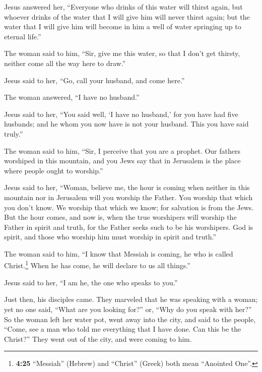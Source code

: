  Jesus answered her, ``Everyone who drinks of this water
will thirst again,  but whoever drinks of the water that
I will give him will never thirst again; but the water that I will give
him will become in him a well of water springing up to eternal life.''

 The woman said to him, ``Sir, give me this water, so
that I don't get thirsty, neither come all the way here to draw.''

 Jesus said to her, ``Go, call your husband, and come
here.''

 The woman answered, ``I have no husband.''

Jesus said to her, ``You said well, `I have no husband,' 
for you have had five husbands; and he whom you now have is not your
husband. This you have said truly.''

 The woman said to him, ``Sir, I perceive that you are a
prophet.  Our fathers worshiped in this mountain, and you
Jews say that in Jerusalem is the place where people ought to worship.''

 Jesus said to her, ``Woman, believe me, the hour is
coming when neither in this mountain nor in Jerusalem will you worship
the Father.  You worship that which you don't know. We
worship that which we know; for salvation is from the Jews.
 But the hour comes, and now is, when the true worshipers
will worship the Father in spirit and truth, for the Father seeks such
to be his worshipers.  God is spirit, and those who
worship him must worship in spirit and truth.''

 The woman said to him, ``I know that Messiah is coming,
he who is called Christ.\footnote{\textbf{4:25} ``Messiah'' (Hebrew) and
  ``Christ'' (Greek) both mean ``Anointed One''.} When he has come, he
will declare to us all things.''

 Jesus said to her, ``I am he, the one who speaks to
you.''

 Just then, his disciples came. They marveled that he was
speaking with a woman; yet no one said, ``What are you looking for?''
or, ``Why do you speak with her?''  So the woman left her
water pot, went away into the city, and said to the people,
 ``Come, see a man who told me everything that I have
done. Can this be the Christ?''  They went out of the
city, and were coming to him.

